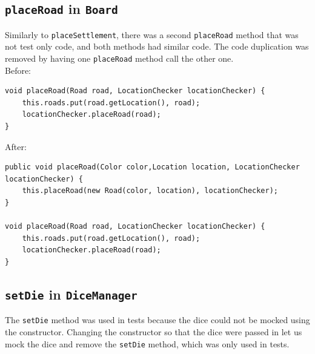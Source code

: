\documentclass{fank1basedocument}
\begin{document}
\subsection*{\texttt{placeRoad} in \texttt{Board}}
Similarly to \texttt{placeSettlement}, there was a second \texttt{placeRoad} method that was not test only code, and both methods had similar code. The code duplication was removed by having one \texttt{placeRoad} method call the other one.\\

Before:
\begin{lstlisting}[style=javacode,language=myJava]
void placeRoad(Road road, LocationChecker locationChecker) {
	this.roads.put(road.getLocation(), road);
	locationChecker.placeRoad(road);
}
\end{lstlisting}
After:
\begin{lstlisting}[style=javacode,language=myJava]
public void placeRoad(Color color,Location location, LocationChecker locationChecker) {
	this.placeRoad(new Road(color, location), locationChecker);
}

void placeRoad(Road road, LocationChecker locationChecker) {
	this.roads.put(road.getLocation(), road);
	locationChecker.placeRoad(road);
}
\end{lstlisting}
\subsection*{\texttt{setDie} in \texttt{DiceManager}}
The \texttt{setDie} method was used in tests because the dice could not be mocked using the constructor. Changing the constructor so that the dice were passed in let us mock the dice and remove the \texttt{setDie} method, which was only used in tests.\\
\end{document}
